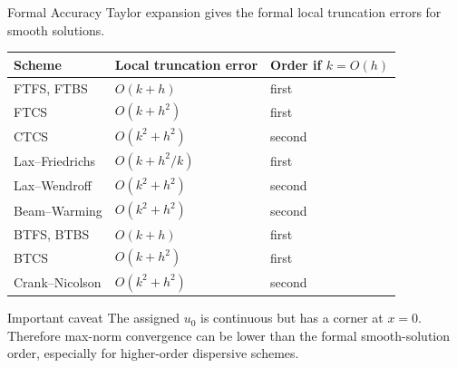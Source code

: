 \documentclass[aspectratio=169,10pt]{beamer}
\begin{document}
\begin{frame}{Formal Accuracy}
    Taylor expansion gives the formal local truncation errors for smooth solutions.

    \begin{table}
        \centering
        \small
        \begin{tabular}{@{}lll@{}}
            \toprule
            Scheme & Local truncation error & Order if $k=O(h)$\\
            \midrule
            FTFS, FTBS & $O(k+h)$ & first\\
            FTCS & $O(k+h^2)$ & first\\
            CTCS & $O(k^2+h^2)$ & second\\
            Lax--Friedrichs & $O(k+h^2/k)$ & first\\
            Lax--Wendroff & $O(k^2+h^2)$ & second\\
            Beam--Warming & $O(k^2+h^2)$ & second\\
            BTFS, BTBS & $O(k+h)$ & first\\
            BTCS & $O(k+h^2)$ & first\\
            Crank--Nicolson & $O(k^2+h^2)$ & second\\
            \bottomrule
        \end{tabular}
    \end{table}

    \begin{alertblock}{Important caveat}
        The assigned $u_0$ is continuous but has a corner at $x=0$.  Therefore max-norm convergence can be lower than the formal smooth-solution order, especially for higher-order dispersive schemes.
    \end{alertblock}
\end{frame}
\end{document}
